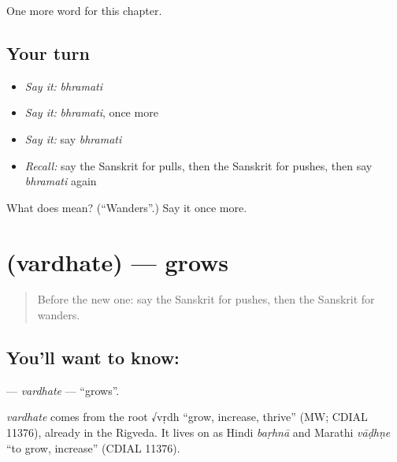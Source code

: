 \begin{grammarlens}[title={What you've built}]
One more word for this chapter.
\end{grammarlens}

\subsection*{Your turn}
\begin{itemize}
\raggedright
  \item \emph{Say it:} \emph{bhramati}
  \item \emph{Say it:} \emph{bhramati}, once more
  \item \emph{Say it:} say \emph{bhramati}
  \item \emph{Recall:} say the Sanskrit for pulls, then the Sanskrit for pushes, then say \emph{bhramati} again
\end{itemize}

\begin{tcolorbox}[breakable,colback=teal!4,colframe=teal!35!black,title={Before you move on}]
What does  mean? (\textquotedblleft{}Wanders\textquotedblright{}.) Say it once more.
\end{tcolorbox}
\section[\texorpdfstring{\sk{वर्धते} (vardhate)}{वर्धते (vardhate)}]{ (vardhate) — grows}

\label{lesson:SA-C138-vardhate}



\begin{quote}
Before the new one: say the Sanskrit for pushes, then the Sanskrit for wanders.
\end{quote}

\subsection*{You'll want to know: }
\textbf{} — \emph{vardhate} — \textquotedblleft{}grows\textquotedblright{}.

\begin{cousinweb}
\emph{vardhate} comes from the root √vṛdh \textquotedblleft{}grow, increase, thrive\textquotedblright{} (MW; CDIAL 11376), already in the Rigveda. It lives on as Hindi \emph{baṛhnā} and Marathi \emph{vāḍhṇe} \textquotedblleft{}to grow, increase\textquotedblright{} (CDIAL 11376).
\end{cousinweb}

